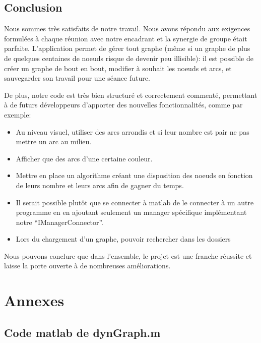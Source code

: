 \documentclass[pidr]{tnreport}
\begin{document}
\cleardoublepage

\chapter{Conclusion}

Nous sommes très satisfaits de notre travail. Nous avons répondu aux exigences formulées à chaque réunion avec notre encadrant et la synergie de groupe était parfaite.
L’application permet de gérer tout graphe (même si un graphe de plus de quelques centaines de noeuds risque de devenir peu illisible): il est possible de créer un graphe de bout en bout, modifier à souhait les noeuds et arcs, et sauvegarder son travail pour une séance future. 

De plus, notre code est très bien structuré et correctement commenté, permettant à de futurs développeurs d’apporter des nouvelles fonctionnalités, comme par exemple:

\begin{itemize}
\item Au niveau visuel, utiliser des arcs arrondis et si leur nombre est pair ne pas mettre un arc au milieu.
\item Afficher que des arcs d’une certaine couleur.
\item Mettre en place un algorithme créant une disposition des noeuds en fonction de leurs nombre et leurs arcs afin de gagner du temps.
\item Il serait possible plutôt que se connecter à matlab de le connecter à un autre programme en en ajoutant seulement un manager spécifique implémentant notre “IManagerConnector”.
\item Lors du chargement  d’un graphe, pouvoir rechercher dans les dossiers
\end{itemize}

Nous pouvons conclure que dans l’ensemble, le projet est une franche réussite et laisse la porte ouverte à de nombreuses améliorations.

\cleardoublepage

\appendix
\part*{Annexes}
\cleardoublepage

\chapter{Code matlab de dynGraph.m}
\end{document}
